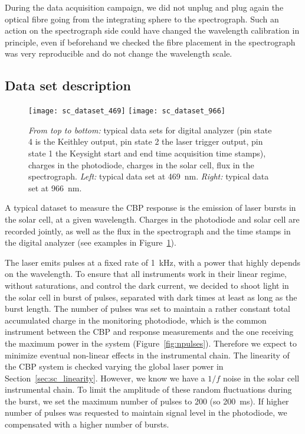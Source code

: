 During the data acquisition campaign, we did not unplug and plug again the optical fibre going from the integrating sphere to the spectrograph. Such an action on the spectrograph side could have changed the wavelength calibration in principle, even if  beforehand we checked the fibre placement in the spectrograph was very reproducible and do not change the wavelength scale.
 
\subsection{Data set description}
\label{sec:cbp_datadesc}

\begin{figure}[!h]
\centering
\texttt{[image: sc\_dataset\_469]}
\texttt{[image: sc\_dataset\_966]}
\caption{\textit{From top to bottom:} typical data sets for digital analyzer (pin state 4 is the Keithley output, pin state 2 the laser trigger output, pin state 1 the Keysight start and end time acquisition time stamps), charges in the photodiode, charges in the solar cell, flux in the spectrograph. \textit{Left:} typical data set at \SI{469}{\nm}. \textit{Right:} typical data set at \SI{966}{\nm}.}\label{fig:sc_dataset_examples}
\end{figure}

A typical dataset to measure the CBP response is the emission of laser bursts in the solar cell, at a given wavelength. Charges in the photodiode and solar cell are recorded jointly, as well as the flux in the spectrograph and the time stamps in the digital analyzer (see examples in Figure~\ref{fig:sc_dataset_examples}).

The laser emits pulses at a fixed rate of \SI{1}{\kilo\hertz}, with a power that highly depends on the wavelength. To ensure that all instruments work in their linear regime, without saturations, and control the dark current, we decided to shoot light in the solar cell in burst of pulses, separated with dark times at least as long as the burst length. The number of pulses was set to maintain a rather constant total accumulated charge in the monitoring photodiode, which is the common instrument between the CBP and \SD response measurements and the one receiving the maximum power in the system (Figure~\ref{fig:npulses}). Therefore we expect to minimize eventual non-linear effects in the instrumental chain. The linearity of the CBP system is checked varying the global laser power in Section~\ref{sec:sc_linearity}. However, we know we have a $1/f$ noise in the solar cell instrumental chain. To limit the amplitude of these random fluctuations during the burst, we set the maximum number of pulses to 200 (so \SI{200}{\ms}). If higher number of pulses was requested to maintain signal level in the photodiode, we compensated with a higher number of bursts.

